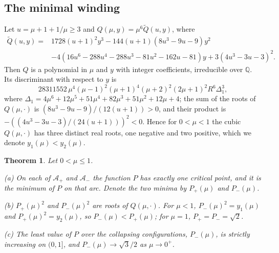 \documentclass[11pt]{article}
\newtheorem{theorem}{Theorem}
\theoremstyle{definition}
\newcommand{\Q}{\mathbb{Q}}
\newcommand{\Ap}{\mathcal{A}_+}
\newcommand{\Am}{\mathcal{A}_-}
\begin{document}
\subsection{The minimal winding}

Let $u = \mu + 1 + 1/\mu \ge 3$ and $Q(\mu, y) = \mu^6 \tilde Q(u, y)$, where
\begin{equation}\label{eq:Q}
\begin{split}
  \tilde Q(u, y) = {}& 1728(u + 1)^2 y^3 - 144(u + 1)(8u^3 - 9u - 9) y^2 \\
  & - 4(16u^6 - 288u^4 - 288u^3 - 81u^2 - 162u - 81) y + 3(4u^3 - 3u - 3)^2.
\end{split}
\end{equation}
Then $Q$ is a polynomial in $\mu$ and $y$ with integer coefficients, irreducible over $\Q$. Its discriminant with respect to $y$ is
\[
  28311552\, \mu^4 (\mu - 1)^2 (\mu + 1)^4 (\mu + 2)^2 (2\mu + 1)^2 R^6 \Delta_1^3,
\]
where $\Delta_1 = 4\mu^6 + 12\mu^5 + 51\mu^4 + 82\mu^3 + 51\mu^2 + 12\mu + 4$; the sum of the roots of $Q(\mu, \cdot)$ is $(8u^3 - 9u - 9)/(12(u + 1)) > 0$, and their product is $-((4u^3 - 3u - 3)/(24(u + 1)))^2 < 0$. Hence for $0 < \mu < 1$ the cubic $Q(\mu, \cdot)$ has three distinct real roots, one negative and two positive, which we denote $y_1(\mu) < y_2(\mu)$.

\begin{theorem}\label{thm:main}
Let $0 < \mu \le 1$.

\textup{(a)} On each of $\Ap$ and $\Am$ the function $P$ has exactly one critical point, and it is the minimum of $P$ on that arc. Denote the two minima by $P_+(\mu)$ and $P_-(\mu)$.

\textup{(b)} $P_+(\mu)^2$ and $P_-(\mu)^2$ are roots of $Q(\mu, \cdot)$. For $\mu < 1$, $P_-(\mu)^2 = y_1(\mu)$ and $P_+(\mu)^2 = y_2(\mu)$, so $P_-(\mu) < P_+(\mu)$; for $\mu = 1$, $P_+ = P_- = \sqrt{2}$.

\textup{(c)} The least value of $P$ over the collapsing configurations, $P_-(\mu)$, is strictly increasing on $(0, 1]$, and $P_-(\mu) \to \sqrt{3}/2$ as $\mu \to 0^+$.
\end{theorem}
\end{document}
